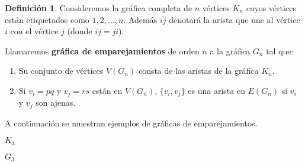 \documentclass[12pt]{book}
\theoremstyle{definition}
\newtheorem{definition}[theorem]{Definición}
\newcounter{in}
\newcounter{ini}
\begin{document}
\begin{definition}
  \label{graf-emparejamientos}
  Consideremos la gráfica completa de $n$ vértices $K_{n}$ cuyos
  vértices están etiquetados como $1,2,\ldots,n$. Además
  $\overline{ij}$ denotará la arista que une al vértice $i$ con el
  vértice $j$ (donde $\overline{ij}=\overline{ji}$).
  
  Llamaremos \textbf{gráfica de emparejamientos} de orden $n$ a la
  gráfica $G_{n}$ tal que:
  
  \begin{enumerate}
  \item Su conjunto de vértices $V(G_{n})$ consta de las aristas de la gráfica
    $K_{n}$. 
  \item Si $v_{i}=\overline{pq}$ y $v_{j}=\overline{rs}$ están en
    $V(G_{n})$, $\{v_{i},v_{j}\}$ es una arista en $E(G_{n})$ si $v_{i}$
    y $v_{j}$ son ajenas.
  \end{enumerate}
\end{definition} 

A continuación se muestran ejemplos de gráficas de emparejamientos.

\begin{center}
\begin{minipage}{0.26\linewidth}
  \centering
  
  $K_{3}$
\end{minipage}
\begin{minipage}{0.26\linewidth}
  \centering
  
  $G_{3}$
\end{minipage}
\end{center}
\end{document}
